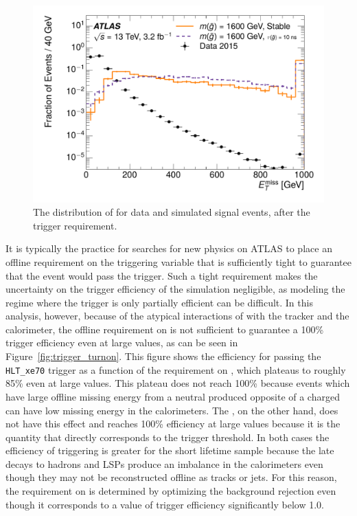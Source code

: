 \begin{figure}[h]
\centering
\includegraphics[width=\fullfig]{figures/selection_met_nm1_log.pdf}
\caption{The distribution of \met for data and simulated signal events, after the trigger requirement.}
\label{fig:nm1_met}
\end{figure}

It is typically the practice for searches for new physics on ATLAS to place an offline requirement on the triggering variable that is sufficiently tight to guarantee that the event would pass the trigger.
Such a tight requirement makes the uncertainty on the trigger efficiency of the simulation negligible, as modeling the regime where the trigger is only partially efficient can be difficult.
In this analysis, however, because of the atypical interactions of \rhadrons with the tracker and the calorimeter, the offline requirement on \met is not sufficient to guarantee a 100\% trigger efficiency even at large values, as can be seen in Figure~\ref{fig:trigger_turnon}.
This figure shows the efficiency for passing the \texttt{HLT\_xe70} trigger as a function of the requirement on \met, which plateaus to roughly 85\% even at large values.
This plateau does not reach 100\% because events which have large offline missing energy from a neutral \rhadron produced opposite of a charged \rhadron can have low missing energy in the calorimeters.
The \calomet, on the other hand, does not have this effect and reaches 100\% efficiency at large values because it is the quantity that directly corresponds to the trigger threshold.
In both cases the efficiency of triggering is greater for the short lifetime sample because the late decays to hadrons and \acp{LSP} produce an imbalance in the calorimeters even though they may not be reconstructed offline as tracks or jets.
For this reason, the requirement on \met is determined by optimizing the background rejection even though it corresponds to a value of trigger efficiency significantly below 1.0.

